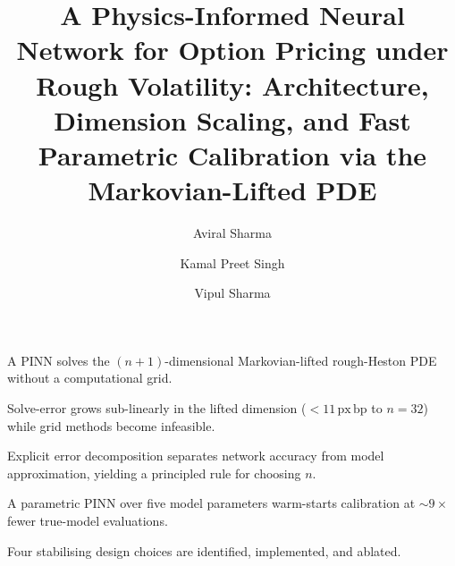 \documentclass[review,12pt]{elsarticle}
\begin{document}
\begin{frontmatter}

\title{A Physics-Informed Neural Network for Option Pricing under Rough
Volatility: Architecture, Dimension Scaling, and Fast Parametric Calibration
via the Markovian-Lifted PDE}

\author[cu]{Aviral Sharma}
\author[sgt]{Kamal Preet Singh}
\author[ind]{Vipul Sharma}


\begin{highlights}
\item A PINN solves the $(n{+}1)$-dimensional Markovian-lifted rough-Heston PDE
      without a computational grid.
\item Solve-error grows sub-linearly in the lifted dimension ($<11\,\mathrm{px\,bp}$
      to $n{=}32$) while grid methods become infeasible.
\item Explicit error decomposition separates network accuracy from model
      approximation, yielding a principled rule for choosing $n$.
\item A parametric PINN over five model parameters warm-starts calibration at
      ${\sim}9\times$ fewer true-model evaluations.
\item Four stabilising design choices are identified, implemented, and ablated.
\end{highlights}


\end{frontmatter}
\end{document}

